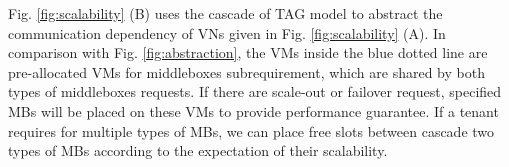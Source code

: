 \documentclass[review]{elsarticle}
\begin{document}
Fig. \ref{fig:scalability} (B) uses the cascade of TAG model to abstract the communication dependency of VNs given in Fig. \ref{fig:scalability} (A). In comparison with Fig. \ref{fig:abstraction}, the VMs inside the blue dotted line are pre-allocated VMs for middleboxes subrequirement, which are shared by both types of middleboxes requests. If there are scale-out or failover request, specified MBs will be placed on these VMs to provide performance guarantee. If a tenant requires for multiple types of MBs, we can place free slots between cascade two types of MBs according to the expectation of their scalability. 

\end{document}
